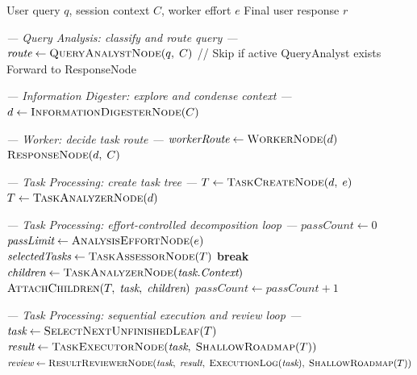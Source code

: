 \documentclass{article}
\begin{document}
\begin{algorithm}[t]
\caption{TINYCUA Main Workflow}
\label{alg:tinycua-main-workflow}
\begin{algorithmic}[1]
\Require User query $q$, session context $C$, worker effort $e$
\Ensure Final user response $r$

\Statex \textit{--- Query Analysis: classify and route query ---}
\State $\textit{route} \gets \textsc{QueryAnalystNode}(q,\; C)$
    \State \Return // Skip if active QueryAnalyst exists
\EndIf
{}
    \State Forward to ResponseNode
    \State \Return
\EndIf

\Statex \textit{--- Information Digester: explore and condense context ---}
\State $d \gets \textsc{InformationDigesterNode}(C)$

\Statex \textit{--- Worker: decide task route ---}
\State $\textit{workerRoute} \gets \textsc{WorkerNode}(d)$
    \State \Return $\textsc{ResponseNode}(d,\; C)$
\EndIf

\Statex \textit{--- Task Processing: create task tree ---}
    \State $T \gets \textsc{TaskCreateNode}(d,\; e)$
    \State $T \gets \textsc{TaskAnalyzerNode}(d)$
\EndIf

\Statex \textit{--- Task Processing: effort-controlled decomposition loop ---}
\State $\textit{passCount} \gets 0$
\State $\textit{passLimit} \gets \textsc{AnalysisEffortNode}(e)$
    \State $\textit{selectedTasks} \gets \textsc{TaskAssessorNode}(T)$
        \State \textbf{break}
    \EndIf
        \State $\textit{children} \gets \textsc{TaskAnalyzerNode}(\textit{task.Context})$
        \State $\textsc{AttachChildren}(T,\; \textit{task},\; \textit{children})$
    \EndFor
    \State $\textit{passCount} \gets \textit{passCount} + 1$
\EndWhile

\Statex \textit{--- Task Processing: sequential execution and review loop ---}
    \State $\textit{task} \gets \textsc{SelectNextUnfinishedLeaf}(T)$
    \State $\textit{result} \gets \textsc{TaskExecutorNode}(\textit{task},\; \textsc{ShallowRoadmap}(T))$
    \State $\textit{review} \gets \textsc{ResultReviewerNode}(\textit{task},\; \textit{result},\; \textsc{ExecutionLog}(\textit{task}),\; \textsc{ShallowRoadmap}(T))$


\end{algorithmic}
\end{algorithm}
\end{document}
